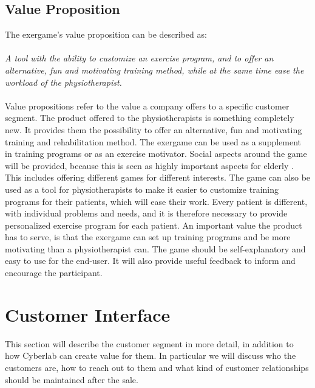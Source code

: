 \subsection{Value Proposition}
The exergame's value proposition can be described as: \\ \\
\emph{A tool with the ability to customize an exercise program, and to offer an alternative, fun and motivating training method, while at the same time ease the workload of the physiotherapist.}\\ \\
Value propositions refer to the value a company offers to a specific customer segment. The product offered to the physiotherapists is something completely new. It provides them the possibility to offer an alternative, fun and motivating training and rehabilitation method. The exergame can be used as a supplement in training programs or as an exercise motivator. Social aspects around the game will be provided, because this is seen as highly important aspects for elderly \cite{exergamesforelderly}. This includes offering different games for different interests. The game can also be used as a tool for physiotherapists to make it easier to customize training programs for their patients, which will ease their work. Every patient is different, with individual problems and needs, and it is therefore necessary to provide personalized exercise program for each patient. An important value the product has to serve, is that the exergame can set up training programs and be more motivating than a physiotherapist can. The game should be self-explanatory and easy to use for the end-user. It will also provide useful feedback to inform and encourage the participant.
\section{Customer Interface}
This section will describe the customer segment in more detail, in addition to how Cyberlab can create value for them. In particular we will discuss who the customers are, how to reach out to them and what kind of customer relationships should be maintained after the sale. 
